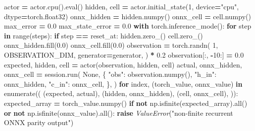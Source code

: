 \documentclass[
  chinese,
  11pt,
  letterpaper,
]{article}
\newenvironment{Shaded}{\begin{snugshade}}{\end{snugshade}}
\newcommand{\BuiltInTok}[1]{#1}
\newcommand{\ControlFlowTok}[1]{\textcolor[rgb]{0.13,0.29,0.53}{\textbf{#1}}}
\newcommand{\DecValTok}[1]{\textcolor[rgb]{0.00,0.00,0.81}{#1}}
\newcommand{\FloatTok}[1]{\textcolor[rgb]{0.00,0.00,0.81}{#1}}
\newcommand{\KeywordTok}[1]{\textcolor[rgb]{0.13,0.29,0.53}{\textbf{#1}}}
\newcommand{\NormalTok}[1]{#1}
\newcommand{\OperatorTok}[1]{\textcolor[rgb]{0.81,0.36,0.00}{\textbf{#1}}}
\newcommand{\PreprocessorTok}[1]{\textcolor[rgb]{0.56,0.35,0.01}{\textit{#1}}}
\newcommand{\StringTok}[1]{\textcolor[rgb]{0.31,0.60,0.02}{#1}}
\newcommand{\VariableTok}[1]{\textcolor[rgb]{0.00,0.00,0.00}{#1}}
\renewenvironment{Shaded}{\par\smallskip}{\par\smallskip}
\begin{document}
\begin{Shaded}
\begin{Highlighting}[]
\NormalTok{    actor }\OperatorTok{=}\NormalTok{ actor.cpu().}\BuiltInTok{eval}\NormalTok{()}
\NormalTok{    hidden, cell }\OperatorTok{=}\NormalTok{ actor.initial\_state(}\DecValTok{1}\NormalTok{, device}\OperatorTok{=}\StringTok{"cpu"}\NormalTok{, dtype}\OperatorTok{=}\NormalTok{torch.float32)}
\NormalTok{    onnx\_hidden }\OperatorTok{=}\NormalTok{ hidden.numpy()}
\NormalTok{    onnx\_cell }\OperatorTok{=}\NormalTok{ cell.numpy()}
\NormalTok{    max\_error }\OperatorTok{=} \FloatTok{0.0}
\NormalTok{    max\_state\_error }\OperatorTok{=} \FloatTok{0.0}
    \ControlFlowTok{with}\NormalTok{ torch.inference\_mode():}
        \ControlFlowTok{for}\NormalTok{ step }\KeywordTok{in} \BuiltInTok{range}\NormalTok{(steps):}
            \ControlFlowTok{if}\NormalTok{ step }\OperatorTok{==}\NormalTok{ reset\_at:}
\NormalTok{                hidden.zero\_()}
\NormalTok{                cell.zero\_()}
\NormalTok{                onnx\_hidden.fill(}\FloatTok{0.0}\NormalTok{)}
\NormalTok{                onnx\_cell.fill(}\FloatTok{0.0}\NormalTok{)}
\NormalTok{            observation }\OperatorTok{=}\NormalTok{ torch.randn(}
                \DecValTok{1}\NormalTok{,}
\NormalTok{                OBSERVATION\_DIM,}
\NormalTok{                generator}\OperatorTok{=}\NormalTok{generator,}
\NormalTok{            ) }\OperatorTok{*} \FloatTok{0.2}
\NormalTok{            observation[:, }\OperatorTok{{-}}\DecValTok{10}\NormalTok{:] }\OperatorTok{=} \FloatTok{0.0}
\NormalTok{            expected, hidden, cell }\OperatorTok{=}\NormalTok{ actor(observation, hidden, cell)}
\NormalTok{            actual, onnx\_hidden, onnx\_cell }\OperatorTok{=}\NormalTok{ session.run(}
                \VariableTok{None}\NormalTok{,}
\NormalTok{                \{}
                    \StringTok{"obs"}\NormalTok{: observation.numpy(),}
                    \StringTok{"h\_in"}\NormalTok{: onnx\_hidden,}
                    \StringTok{"c\_in"}\NormalTok{: onnx\_cell,}
\NormalTok{                \},}
\NormalTok{            )}
            \ControlFlowTok{for}\NormalTok{ index, (torch\_value, onnx\_value) }\KeywordTok{in} \BuiltInTok{enumerate}\NormalTok{((}
\NormalTok{                (expected, actual), (hidden, onnx\_hidden), (cell, onnx\_cell),}
\NormalTok{            )):}
\NormalTok{                expected\_array }\OperatorTok{=}\NormalTok{ torch\_value.numpy()}
                \ControlFlowTok{if} \KeywordTok{not}\NormalTok{ np.isfinite(expected\_array).}\BuiltInTok{all}\NormalTok{() }\KeywordTok{or} \KeywordTok{not}\NormalTok{ np.isfinite(onnx\_value).}\BuiltInTok{all}\NormalTok{():}
                    \ControlFlowTok{raise} \PreprocessorTok{ValueError}\NormalTok{(}\StringTok{"non{-}finite recurrent ONNX parity output"}\NormalTok{)}

\end{Highlighting}
\end{Shaded}
\end{document}
